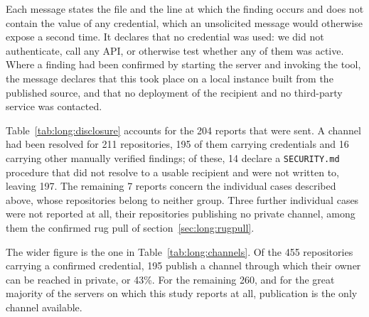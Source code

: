 Each message states the file and the line at which the finding occurs and does
not contain the value of any credential, which an unsolicited message would
otherwise expose a second time. It declares that no credential was used:
we did not authenticate, call any API, or otherwise test whether any of them was
active. Where a finding had been confirmed by starting the server and invoking
the tool, the message declares that this took place on a local instance built
from the published source, and that no deployment of the recipient and no
third-party service was contacted.

Table~\ref{tab:long:disclosure} accounts for the 204 reports that were sent. A
channel had been resolved for 211 repositories, 195 of them carrying credentials
and 16 carrying other manually verified findings; of these, 14 declare a
\texttt{SECURITY.md} procedure that did not resolve to a usable recipient and were
not written to, leaving 197. The remaining 7 reports concern the individual cases
described above, whose repositories belong to neither group. Three further
individual cases were not reported at all, their repositories publishing no
private channel, among them the confirmed rug pull of
section~\ref{sec:long:rugpull}.

The wider figure is the one in Table~\ref{tab:long:channels}. Of the 455
repositories carrying a confirmed credential, 195 publish a channel through which
their owner can be reached in private, or 43\%. For the remaining 260, and for the
great majority of the servers on which this study reports at all, publication is
the only channel available.
